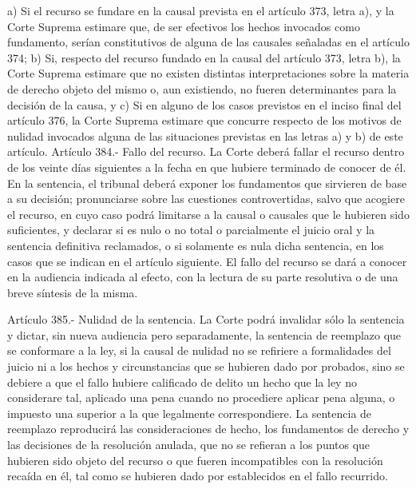     a) Si el recurso se fundare en la causal prevista en el artículo 373, letra a), y la Corte Suprema estimare que, de ser efectivos los hechos invocados como fundamento, serían constitutivos de alguna de las causales señaladas en el artículo 374;
    b) Si, respecto del recurso fundado en la causal del artículo 373, letra b), la Corte Suprema estimare que no existen distintas interpretaciones sobre la materia de derecho objeto del mismo o, aun existiendo, no fueren determinantes para la decisión de la causa, y c) Si en alguno de los casos previstos en el inciso final del artículo 376, la Corte Suprema estimare que concurre respecto de los motivos de nulidad invocados alguna de las situaciones previstas en las letras a) y b) de este artículo.
    Artículo 384.- Fallo del recurso. La Corte deberá fallar el recurso dentro de los veinte días siguientes a la fecha en que hubiere terminado de conocer de él.
    En la sentencia, el tribunal deberá exponer los fundamentos que sirvieren de base a su decisión; pronunciarse sobre las cuestiones controvertidas, salvo que acogiere el recurso, en cuyo caso podrá limitarse a la causal o causales que le hubieren sido suficientes, y declarar si es nulo o no total o parcialmente el juicio oral y la sentencia definitiva reclamados, o si solamente es nula dicha sentencia, en los casos que se indican en el artículo siguiente.
    El fallo del recurso se dará a conocer en la audiencia indicada al efecto, con la lectura de su parte resolutiva o de una breve síntesis de la misma.


    Artículo 385.- Nulidad de la sentencia. La Corte podrá invalidar sólo la sentencia y dictar, sin nueva audiencia pero separadamente, la sentencia de reemplazo que se conformare a la ley, si la causal de nulidad no se refiriere a formalidades del juicio ni a los hechos y circunstancias que se hubieren dado por probados, sino se debiere a que el fallo hubiere calificado de delito un hecho que la ley no considerare tal, aplicado una pena cuando no procediere aplicar pena alguna, o impuesto una superior a la que legalmente correspondiere.
    La sentencia de reemplazo reproducirá las consideraciones de hecho, los fundamentos de derecho y las decisiones de la resolución anulada, que no se refieran a los puntos que hubieren sido objeto del recurso o que fueren incompatibles con la resolución recaída en él, tal como se hubieren dado por establecidos en el fallo recurrido.

